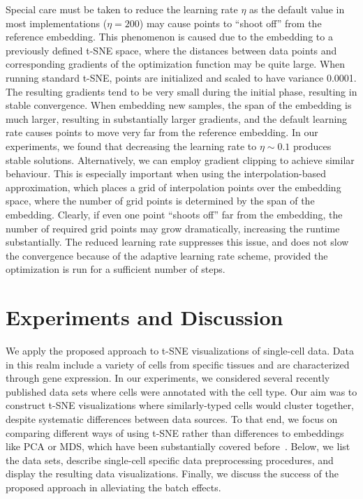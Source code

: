 \documentclass[runningheads]{llncs}
\begin{document}
Special care must be taken to reduce the learning rate $\eta$ as the default
value in most implementations ($\eta = 200$) may cause points to ``shoot off''
from the reference embedding. This phenomenon is caused due to the embedding to
a previously defined t-SNE space, where the distances between data points and
corresponding gradients of the optimization function may be quite large. When
running standard t-SNE, points are initialized and scaled to have variance
0.0001. The resulting gradients tend to be very small during the initial phase,
resulting in stable convergence. When embedding new samples, the span of the
embedding is much larger, resulting in substantially larger gradients, and the
default learning rate causes points to move very far from the reference
embedding. In our experiments, we found that decreasing the learning rate to
$\eta \sim 0.1$ produces stable solutions. Alternatively, we can employ gradient
clipping to achieve similar behaviour. This is especially important when
using the interpolation-based approximation, which places a grid of
interpolation points over the embedding space, where the number of grid points
is determined by the span of the embedding. Clearly, if even one point ``shoots
off'' far from the embedding, the number of required grid points may grow
dramatically, increasing the runtime substantially. The reduced learning rate
suppresses this issue, and does not slow the convergence because of the
adaptive learning rate scheme, provided the optimization is run for a
sufficient number of steps.

\section{Experiments and Discussion}

We apply the proposed approach to t-SNE visualizations of single-cell data.
Data in this realm include a variety of cells from specific tissues and are
characterized through gene expression.  In our experiments, we considered
several recently published data sets where cells were annotated with the cell
type. Our aim was to construct t-SNE visualizations where similarly-typed cells
would cluster together, despite systematic differences between data sources. To
that end, we focus on comparing different ways of using t-SNE rather than
differences to embeddings like PCA or MDS, which have been substantially
covered before~\cite{Maaten2008,Becht2019}.  Below, we list the data sets,
describe single-cell specific data preprocessing procedures, and display the
resulting data visualizations. Finally, we discuss the success of the proposed
approach in alleviating the batch effects.
\end{document}
